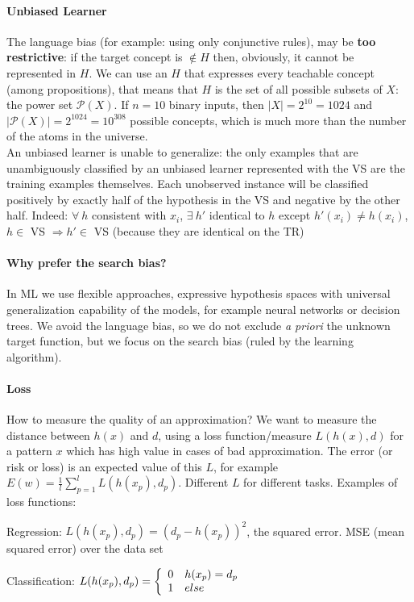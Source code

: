 \documentclass[10pt]{report}
\begin{document}
\paragraph{Unbiased Learner} The language bias (for example: using only conjunctive rules), may be \textbf{too restrictive}: if the target concept is $\not\in H$ then, obviously, it cannot be represented in $H$. We can use an $H$ that expresses every teachable concept (among propositions), that means that $H$ is the set of all possible subsets of $X$: the power set $\mathscr{P}(X)$. If $n = 10$ binary inputs, then $|X| = 2^{10} = 1024$ and $|\mathscr{P}(X)| = 2^{1024} = 10^{308}$ possible concepts, which is much more than the number of the atoms in the universe.\\
An unbiased learner is unable to generalize: the only examples that are unambiguously classified by an unbiased learner represented with the VS are the training examples themselves. Each unobserved instance will be classified positively by exactly half of the hypothesis in the VS and negative by the other half. Indeed: $\forall\: h$ consistent with $x_i$, $\exists\:h'$ identical to $h$ except $h'(x_i) \neq h(x_i)$, $h\in$ VS $\Rightarrow h'\in$ VS (because they are identical on the TR)
\paragraph{Why prefer the search bias?} In ML we use flexible approaches, expressive hypothesis spaces with universal generalization capability of the models, for example neural networks or decision trees. We avoid the language bias, so we do not exclude \textit{a priori} the unknown target function, but we focus on the search bias (ruled by the learning algorithm).
\paragraph{Loss} How to measure the quality of an approximation? We want to measure the distance between $h(x)$ and $d$, using a loss function/measure $L(h(x), d)$ for a pattern $x$ which has high value in cases of bad approximation. The error (or risk or loss) is an expected value of this $L$, for example $E(w) = \frac{1}{l}\sum_{p=1}^l L(h(x_p), d_p)$. Different $L$ for different tasks. Examples of loss functions:
\begin{list}{}{}
	\item Regression: $L(h(x_p), d_p) = (d_p - h(x_p))^2$, the squared error. MSE (mean squared error) over the data set
	\item Classification: $L(h(x_p), d_p) = \left\{\begin{array}{l l}
		0 & h(x_p) = d_p\\
		1 & else
	\end{array}\right.$
\end{list}
\end{document}
